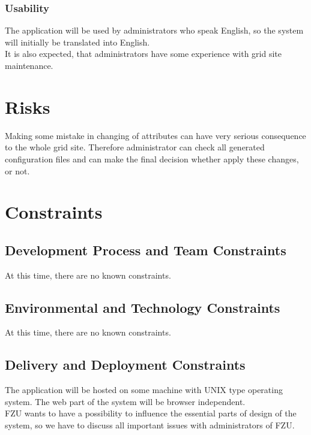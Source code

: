 \documentclass[12pt]{article}
\begin{document}
\subsubsection{Usability}
The application will be used by administrators who speak English, so the system will initially be translated into English.\\
It is also expected, that administrators have some experience with grid site maintenance.


\section{Risks}
Making some mistake in changing of attributes can have very serious consequence to the whole grid site. Therefore administrator can
check all generated configuration files and can make the final decision whether apply these changes, or not.


\section{Constraints}

\subsection{Development Process and Team Constraints}
At this time, there are no known constraints.

\subsection{Environmental and Technology Constraints}
At this time, there are no known constraints.

\subsection{Delivery and Deployment Constraints}
The application will be hosted on some machine with UNIX type operating system. The web part of the system will be browser 
independent.\\
FZU wants to have a possibility to influence the essential parts of design of the system, so we have to discuss all important issues
with administrators of FZU.
\end{document}
